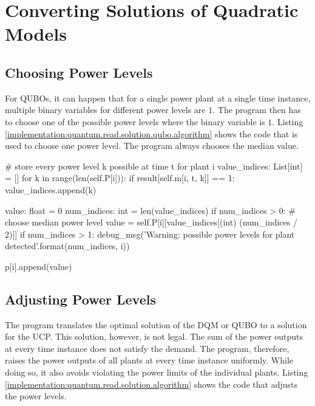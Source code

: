 \section{Converting Solutions of Quadratic Models}

\subsection{Choosing Power Levels}
\label{implementation:quantum.read.solution.qubo}

For QUBOs, it can happen that for a single power plant at a single time instance, multiple binary variables for different power levels are $1$.
The program then has to choose one of the possible power levels where the binary variable is $1$.
Listing \ref{implementation:quantum.read.solution.qubo.algorithm} shows the code that is used to choose one power level.
The program always chooses the median value.

\begin{python}[
  float,
  caption={Choosing Power Levels from the QUBO},
  label={implementation:quantum.read.solution.qubo.algorithm}
]
# store every power level k possible at time t for plant i
value_indices: List[int] = []
for k in range(len(self.P[i])):
  if result[self.m[i, t, k]] == 1:
    value_indices.append(k)

value: float = 0
num_indices: int = len(value_indices)
if num_indices > 0:
  # choose median power level
  value = self.P[i][value_indices[(int) (num_indices / 2)]]
  if num_indices > 1:
    debug_msg('Warning: {} possible power levels for plant {} detected'.format(num_indices, i))

p[i].append(value)
\end{python}

\subsection{Adjusting Power Levels}
\label{implementation:quantum.read.solution}

The program translates the optimal solution of the DQM or QUBO to a solution for the UCP.
This solution, however, is not legal.
The sum of the power outputs at every time instance does not satisfy the demand.
The program, therefore, raises the power outputs of all plants at every time instance uniformly.
While doing so, it also avoids violating the power limits of the individual plants.
Listing \ref{implementation:quantum.read.solution.algorithm} shows the code that adjusts the power levels.


